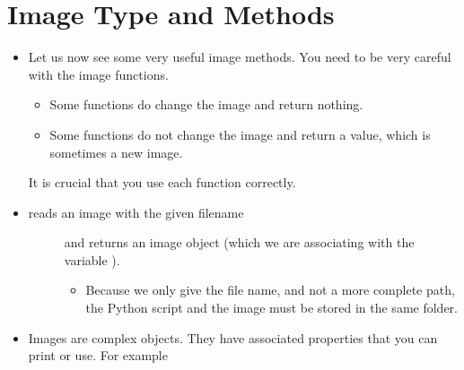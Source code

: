\documentclass[letterpaper,10pt,english]{sphinxmanual}
\begin{document}
\section{Image Type and Methods}
\label{\detokenize{lecture_notes/lec07_modules_images:image-type-and-methods}}\begin{itemize}
\item {} 
Let us now see some very useful image methods. You need to be very
careful with the image functions.
\begin{itemize}
\item {} 
Some functions do change the
image and return nothing.

\item {} 
Some functions do not change the image and return a value, which
is sometimes a new image.

\end{itemize}

It is crucial that you use each function correctly.

\item {} \begin{description}
\item[{ reads an image with the given filename}] \leavevmode
and returns an image object (which we are associating with the variable
).
\begin{itemize}
\item {} 
Because we only give the file name, and not a more complete
path, the Python script and the image must be stored in the
same folder.

\end{itemize}

\end{description}

\item {} 
Images are complex objects. They have associated properties
that you can print or use.  For example

%
\begin{sphinxVerbatim}[commandchars=\\\{\}]
  
\end{sphinxVerbatim}


\end{itemize}
\end{document}
